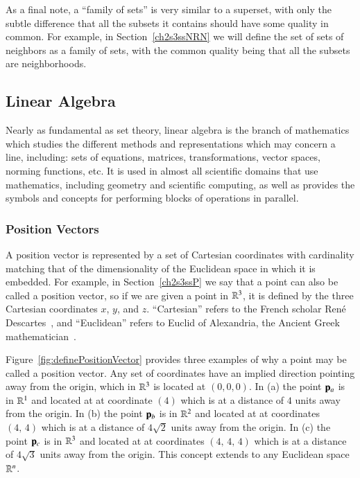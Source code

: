 As a final note, a ``family of sets'' is very similar to a superset, with only the subtle difference that all the subsets it contains should have some quality in common. For example, in Section~\ref{ch2s3ssNRN} we will define the set of sets of neighbors as a family of sets, with the common quality being that all the subsets are neighborhoods.

%
%
%
\subsection{Linear Algebra}
\label{ch2sBssLA}
Nearly as fundamental as set theory, linear algebra is the branch of mathematics which studies the different methods and representations which may concern a line, including: sets of equations, matrices, transformations, vector spaces, norming functions, etc. It is used in almost all scientific domains that use mathematics, including geometry and scientific computing, as well as provides the symbols and concepts for performing blocks of operations in parallel.~\cite{Weisstein19i} 

%
\subsubsection{Position Vectors}
\label{ch2sBssLAsssPV}
A position vector is represented by a set of Cartesian coordinates with cardinality matching that of the dimensionality of the Euclidean space in which it is embedded. For example, in Section~\ref{ch2s3ssP} we say that a point can also be called a position vector, so if we are given a point in $\mathbb{R}^{3}$, it is defined by the three Cartesian coordinates $x$, $y$, and $z$. ``Cartesian'' refers to the French scholar René Descartes~\cite{EB1}, and ``Euclidean'' refers to Euclid of Alexandria, the Ancient Greek mathematician~\cite{EB2}.

Figure~\ref{fig:definePositionVector} provides three examples of why a point may be called a position vector. Any set of coordinates have an implied direction pointing away from the origin, which in $\mathbb{R}^{3}$ is located at $(0, 0, 0)$. In (a) the point $\mathbf{p}_a$ is in $\mathbb{R}^{1}$ and located at at coordinate $(4)$ which is at a distance of $4$ units away from the origin. In (b) the point $\mathbf{p}_b$ is in $\mathbb{R}^{2}$ and located at at coordinates $(4,\,4)$ which is at a distance of $4\sqrt{2}$ units away from the origin. In (c) the point $\mathbf{p}_c$ is in $\mathbb{R}^{3}$ and located at at coordinates $(4,\,4,\,4)$ which is at a distance of $4\sqrt{3}$ units away from the origin. This concept extends to any Euclidean space $\mathbb{R}^{n}$.

